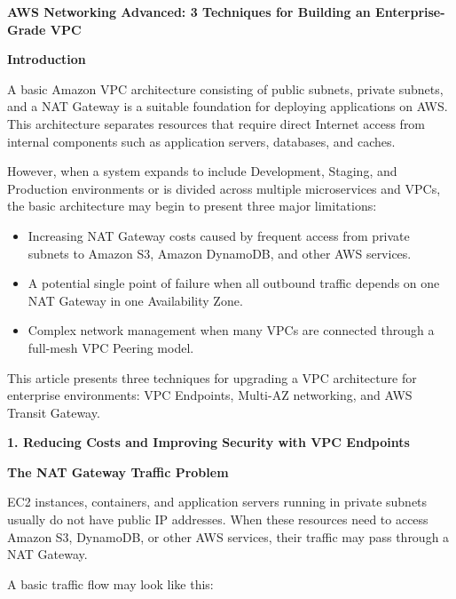 \vspace{0.5em}\noindent\textbf{AWS Networking Advanced: 3 Techniques for Building an
Enterprise-Grade
VPC}\par

\vspace{0.5em}\noindent\textbf{Introduction}\par

A basic Amazon VPC architecture consisting of public subnets, private
subnets, and a NAT Gateway is a suitable foundation for deploying
applications on AWS. This architecture separates resources that require
direct Internet access from internal components such as application
servers, databases, and caches.

However, when a system expands to include Development, Staging, and
Production environments or is divided across multiple microservices and
VPCs, the basic architecture may begin to present three major
limitations:

\begin{itemize}
\tightlist
\item
  Increasing NAT Gateway costs caused by frequent access from private
  subnets to Amazon S3, Amazon DynamoDB, and other AWS services.
\item
  A potential single point of failure when all outbound traffic depends
  on one NAT Gateway in one Availability Zone.
\item
  Complex network management when many VPCs are connected through a
  full-mesh VPC Peering model.
\end{itemize}

This article presents three techniques for upgrading a VPC architecture
for enterprise environments: VPC Endpoints, Multi-AZ networking, and AWS
Transit Gateway.

\vspace{0.5em}\noindent\textbf{1. Reducing Costs and Improving Security with VPC
Endpoints}\par

\vspace{0.5em}\noindent\textbf{The NAT Gateway Traffic
Problem}\par

EC2 instances, containers, and application servers running in private
subnets usually do not have public IP addresses. When these resources
need to access Amazon S3, DynamoDB, or other AWS services, their traffic
may pass through a NAT Gateway.

A basic traffic flow may look like this:

